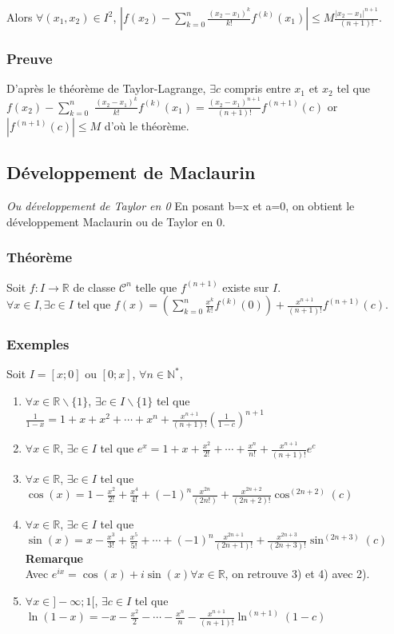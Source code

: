 \documentclass[a4paper,10pt]{book} %
\newcommand{\R}{\mathbb{R}}
\newcommand{\N}{\mathbb{N}}
\begin{document}
Alors $\forall (x_1, x_2)\in I^2$, $|f(x_2)-\sum\limits_{k=0}^{n}\frac{(x_2-x_1)^k}{k!}f^{(k)}(x_1)|\leq M\frac{|x_2-x_1|^{n+1}}{(n+1)!}$.

\subsubsection{Preuve}
D'après le théorème de Taylor-Lagrange, $\exists c$ compris entre $x_1$ et $x_2$ tel que\\
$f(x_2)-\sum\limits_{k=0}^n$ $\frac{(x_2-x_1)^k}{k!}f^{(k)}(x_1)=\frac{(x_2-x_1)^{n+1}}{(n+1)!}f^{(n+1)}(c)$
or $|f^{(n+1)}(c)| \leq M$ d'où le théorème.

\subsection{Développement de Maclaurin}
\textit{Ou développement de Taylor en 0}
En posant b=x et a=0, on obtient le développement Maclaurin ou de Taylor en 0.

\subsubsection{Théorème}
Soit $f:I\rightarrow \R$ de classe $\mathcal{C}^n$ telle que $f^{(n+1)}$ existe sur $I$.\\

$\forall x\in I, \exists c\in I$ tel que $f(x)=\left(\sum\limits_{k=0}^n \frac{x^k}{k!}f^{(k)}(0)\right) +\frac{x^{n+1}}{(n+1)!}f^{(n+1)}(c)$.

\subsubsection{Exemples}
Soit $I=[x;0]$ ou $[0;x]$, $\forall n\in \N^*$,
\begin{enumerate}
\item $\forall x\in \R\backslash\{1\}$, $\exists c\in I\backslash \{1 \}$ tel que $\frac{1}{1-x}=1+x+x^2+\cdots+x^n+\frac{x^{n+1}}{(n+1)!}(\frac{1}{1-c})^{n+1}$

\item $\forall x\in \R$, $\exists c\in I$ tel que
$e^x=1+x+\frac{x^2}{2!}+\cdots+\frac{x^n}{n!}+\frac{x^{n+1}}{(n+1)!}e^c$

\item $\forall x\in \R$, $\exists c\in I$ tel que $\cos(x)=1-\frac{x^2}{2!}+\frac{x^4}{4!}+(-1)^n\frac{x^{2n}}{(2n!)}+\frac{x^{2n+2}}{(2n+2)!} \cos^{(2n+2)}(c)$

\item $\forall x\in \R$, $\exists c\in I$ tel que $\sin(x)=x-\frac{x^3}{3!}+\frac{x^5}{5!}+\cdots+(-1)^n\frac{x^{2n+1}}{(2n+1)!}+\frac{x^{2n+3}}{(2n+3)!}\sin^{(2n+3)}(c)$\\

\textbf{Remarque}\\
Avec $e^{ix}=\cos(x)+i \sin(x) \forall x\in \R$, on retrouve 3) et 4) avec 2).\\

\item $\forall x\in ]-\infty; 1[$, $\exists c\in I$ tel que
$\ln(1-x)=-x-\frac{x^2}{2}-\cdots-\frac{x^n}{n}-\frac{x^{n+1}}{(n+1)!} \ln^{(n+1)}{(1-c)}$ \end{enumerate}
\end{document}

